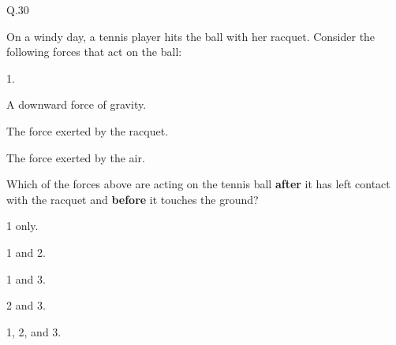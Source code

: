     \begin{mcq}{Q.30}{On a windy day, a tennis player hits the ball with her racquet. Consider the following forces that act on the ball:

        \eline[]
        \begin{options}{1.}
            \item A downward force of gravity.
            \item The force exerted by the racquet.
            \item The force exerted by the air.
        \end{options}
        \eline[]

        Which of the forces above are acting on the tennis ball \textbf{after} it has left contact with the racquet and \textbf{before} it touches the ground?
    }
        \item 1 only.
        \item 1 and 2.
        \item 1 and 3.
        \item 2 and 3.
        \item 1, 2, and 3.
    \end{mcq}

    \vfill      %
    \theendnotes


